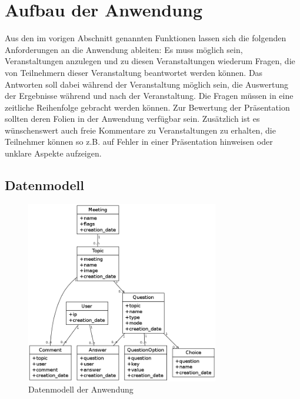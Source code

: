 \section{Aufbau der Anwendung}

Aus den im vorigen Abschnitt genannten Funktionen lassen sich die folgenden Anforderungen an die Anwendung ableiten: Es muss möglich sein, Veranstaltungen anzulegen und zu diesen Veranstaltungen wiederum Fragen, die von Teilnehmern dieser Veranstaltung beantwortet werden können. Das Antworten soll dabei während der Veranstaltung möglich sein, die Auswertung der Ergebnisse während und nach der Veranstaltung. Die Fragen müssen in eine zeitliche Reihenfolge gebracht werden können. Zur Bewertung der Präsentation sollten deren Folien in der Anwendung verfügbar sein. Zusätzlich ist es wünschenswert auch freie Kommentare zu Veranstaltungen zu erhalten, die Teilnehmer können so z.B. auf Fehler in einer Präsentation hinweisen oder unklare Aspekte aufzeigen.

\subsection{Datenmodell}

\begin{figure}[htb]
\begin{center}
\includegraphics[width=0.75\textwidth]{media/models.png}
\end{center}
\caption{Datenmodell der Anwendung}
\label{f:models}
\end{figure}

